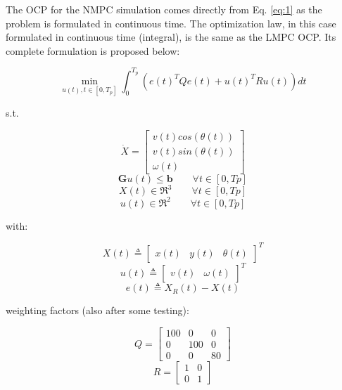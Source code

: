 \documentclass[conference]{IEEEtran}
\begin{document}
The OCP for the NMPC simulation comes directly from Eq. \ref{eq:1} as the problem is formulated in continuous time. The optimization law, in this case formulated in continuous time (integral), is the same as the LMPC OCP. Its complete formulation is proposed below:

\begin{equation} \label{eq:6}
\min_{u(t),t \in [0,T_{p}]}\int_{0}^{T_{p}}(e(t)^{T}Q e(t)+
u(t)^{T}Ru(t))dt
\end{equation}

s.t.

\begin{equation*}
\dot{X} = \left[\begin{array}{c}
v(t)cos(\theta(t)) \\ v(t)sin(\theta(t)) \\ \omega(t) \end{array}\right]
\end{equation*}
\begin{equation*}
\mathbf{G}u(t) \leq \mathbf{b} \qquad \forall t \in [0,Tp]
\end{equation*}
\begin{equation*}
X(t) \in \Re^{3} \qquad \forall t \in [0,Tp]
\end{equation*}
\begin{equation*}
u(t) \in \Re^{2} \qquad \forall t \in [0,Tp]
\end{equation*}

with:

\begin{equation*}
X(t) \triangleq \left[\begin{array}{ccc}
x(t) & y(t) & \theta(t) \end{array}\right]^{T}
\end{equation*}
\begin{equation*}
u(t) \triangleq \left[\begin{array}{cc}
v(t) & \omega(t)\end{array}\right]^{T}
\end{equation*}
\begin{equation*}
e(t) \triangleq X_{R}(t)-X(t)
\end{equation*}


weighting factors (also after some testing):

\begin{equation*}
Q = \left[\begin{array}{ccc} 100 & 0 & 0 \\
0 & 100 & 0 \\
0 & 0 & 80 \end{array} \right]
\end{equation*}
\begin{equation*}
R = \left[\begin{array}{cc} 1 & 0 \\
0 & 1 \end{array} \right]
\end{equation*}
\end{document}
